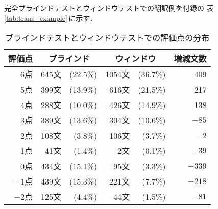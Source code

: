 完全ブラインドテストとウィンドウテストでの翻訳例を付録の
表\ref{tab:trans_example}\,に示す．
\begin{table}[tbhp]
\caption{ブラインドテストとウィンドウテストでの評価点の分布}
\label{tab:experiment_result1}
\begin{center}
\begin{tabular}{|r||r@{}r|r@{}r|r|}\hline
\multicolumn{1}{|c||}{評価点}&
\multicolumn{2}{c|}{ブラインド}&
\multicolumn{2}{c|}{ウィンドウ}&
\multicolumn{1}{c|}{増減文数}\\\hline\hline
 6点   & 645文 & (22.5\%) & 1054文 & (36.7\%) & 409    \\
 5点   & 399文 & (13.9\%) &  616文 & (21.5\%) & 217    \\
 4点   & 288文 & (10.0\%) &  426文 & (14.9\%) & 138    \\
 3点   & 389文 & (13.6\%) &  304文 & (10.6\%) & $-85$  \\
 2点   & 108文 &  (3.8\%) &  106文 &  (3.7\%) & $-2$   \\
 1点   &  41文 &  (1.4\%) &    2文 &  (0.1\%) & $-39$  \\
 0点   & 434文 & (15.1\%) &   95文 &  (3.3\%) & $-339$ \\
$-1$点 & 439文 & (15.3\%) &  221文 &  (7.7\%) & $-218$ \\
$-2$点 & 125文 &  (4.4\%) &   44文 &  (1.5\%) & $-81$  \\\hline
\end{tabular}
\end{center}
\end{table}
